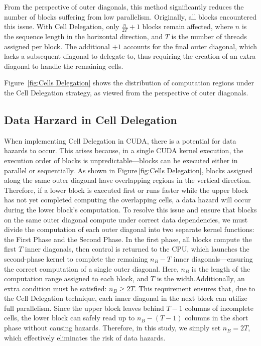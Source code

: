 \documentclass[PhD]{PHlab-thesis}
\begin{document}
From the perspective of outer diagonals, this method significantly reduces the number of blocks suffering from low parallelism. Originally, all blocks encountered this issue. With Cell Delegation, only $\frac{n}{2T} + 1$ blocks remain affected, where $n$ is the sequence length in the horizontal direction, and $T$ is the number of threads assigned per block. The additional $+1$ accounts for the final outer diagonal, which lacks a subsequent diagonal to delegate to, thus requiring the creation of an extra diagonal to handle the remaining cells.

Figure~\ref{fig:Cells Delegation} shows the distribution of computation regions under the Cell Delegation strategy, as viewed from the perspective of outer diagonals.

\subsection{Data Harzard in Cell Delegation}
When implementing Cell Delegation in CUDA, there is a potential for data hazards to occur. This arises because, in a single CUDA kernel execution, the execution order of blocks is unpredictable—blocks can be executed either in parallel or sequentially. As shown in Figure \ref{fig:Cells Delegation}, blocks assigned along the same outer diagonal have overlapping regions in the vertical direction. Therefore, if a lower block is executed first or runs faster while the upper block has not yet completed computing the overlapping cells, a data hazard will occur during the lower block's computation.
To resolve this issue and ensure that blocks on the same outer diagonal compute under correct data dependencies, we must divide the computation of each outer diagonal into two separate kernel functions: the First Phase and the Second Phase. In the first phase, all blocks compute the first $T$ inner diagonals, then control is returned to the CPU, which launches the second-phase kernel to complete the remaining $n_B - T$ inner diagonals—ensuring the correct computation of a single outer diagonal. Here, $n_B$ is the length of the computation range assigned to each block, and $T$ is the width.Additionally, an extra condition must be satisfied: $n_B \ge 2T$. This requirement ensures that, due to the Cell Delegation technique, each inner diagonal in the next block can utilize full parallelism. Since the upper block leaves behind $T - 1$ columns of incomplete cells, the lower block can safely read up to $n_B - (T - 1)$ columns in the short phase without causing hazards. Therefore, in this study, we simply set $n_B = 2T$, which effectively eliminates the risk of data hazards.
\end{document}
